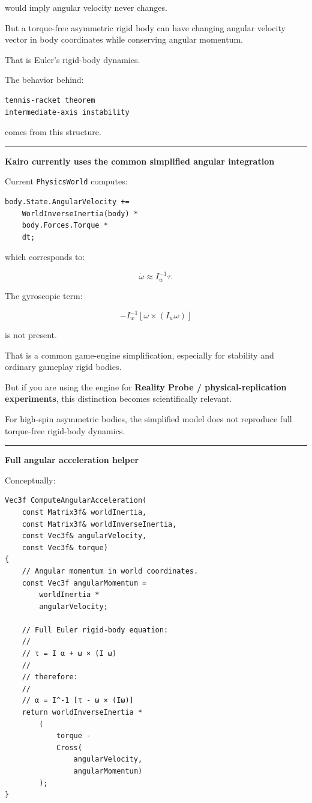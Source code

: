 would imply angular velocity never changes.

But a torque-free asymmetric rigid body can have changing angular velocity vector in body coordinates while conserving angular momentum.

That is Euler's rigid-body dynamics.

The behavior behind:

\begin{verbatim}
tennis-racket theorem
intermediate-axis instability
\end{verbatim}

comes from this structure.

\begin{center}\rule{0.5\linewidth}{0.5pt}\end{center}

\textbf{Kairo currently uses the common simplified angular integration}

Current \texttt{PhysicsWorld} computes:

\begin{verbatim}
body.State.AngularVelocity +=
    WorldInverseInertia(body) *
    body.Forces.Torque *
    dt;
\end{verbatim}

which corresponds to:

\[
\dot\omega
\approx
I_w^{-1}\tau.
\]

The gyroscopic term:

\[
-I_w^{-1}
[
\omega\times(I_w\omega)
]
\]

is not present.

That is a common game-engine simplification, especially for stability and ordinary gameplay rigid bodies.

But if you are using the engine for \textbf{Reality Probe / physical-replication experiments}, this distinction becomes scientifically relevant.

For high-spin asymmetric bodies, the simplified model does not reproduce full torque-free rigid-body dynamics.

\begin{center}\rule{0.5\linewidth}{0.5pt}\end{center}

\textbf{Full angular acceleration helper}

Conceptually:

\begin{verbatim}
Vec3f ComputeAngularAcceleration(
    const Matrix3f& worldInertia,
    const Matrix3f& worldInverseInertia,
    const Vec3f& angularVelocity,
    const Vec3f& torque)
{
    // Angular momentum in world coordinates.
    const Vec3f angularMomentum =
        worldInertia *
        angularVelocity;

    // Full Euler rigid-body equation:
    //
    // τ = I α + ω × (I ω)
    //
    // therefore:
    //
    // α = I^-1 [τ - ω × (Iω)]
    return worldInverseInertia *
        (
            torque -
            Cross(
                angularVelocity,
                angularMomentum)
        );
}
\end{verbatim}

